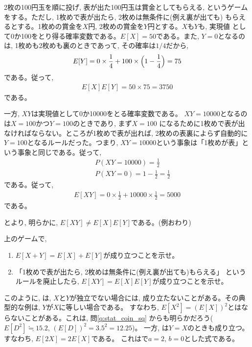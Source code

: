 \begin{exmpl} 2枚の100円玉を順に投げ, 表が出た100円玉は賞金としてもらえる, 
というゲームをする。ただし, 1枚めで表が出たら, 2枚めは無条件に(例え裏が出ても)
もらえるとする。1枚めの賞金を$X$円, 2枚めの賞金を$Y$円とする。$X$も$Y$も, 実現値
として0か100をとり得る確率変数である。$E[X]=50$である。また, 
$Y=0$となるのは, 1枚めも2枚めも裏のときであって, その確率は$1/4$だから, 
\begin{eqnarray}
E[Y]=0\times\frac{1}{4}+100\times\Bigl(1-\frac{1}{4}\Bigr)=75
\end{eqnarray}
である。従って, 
\begin{eqnarray}
E[X]E[Y]=50\times75=3750\label{eq:prob_3750}
\end{eqnarray}である。

一方, $XY$は実現値として0か10000をとる確率変数である。
$XY=10000$となるのは$X=100$かつ$Y=100$のときであり, まず$X=100$
になるために1枚めで表が出なければならない。ところが1枚めで表が出れば, 
2枚めの表裏によらず自動的に$Y=100$となるルールだった。つまり, 
$XY=10000$という事象は「1枚めが表」という事象と同じである。従って, 
\begin{eqnarray}
&&P(XY=10000)=\frac{1}{2}\\
&&P(XY=0)=1-\frac{1}{2}=\frac{1}{2}
\end{eqnarray}
である。従って, 
\begin{eqnarray}
E[XY]=0\times\frac{1}{2}+10000\times\frac{1}{2}=5000\label{eq:prob_5000}
\end{eqnarray}
である。

とより, 明らかに, 
$E[XY]\neq E[X]E[Y]$である。(例おわり)
\end{exmpl}
\mv

\begin{q}\label{q:stat_2coins_indep} 上のゲームで, 
\begin{enumerate}
\item $E[X+Y]=E[X]+E[Y]$が成り立つことを示せ。
\item 「1枚めで表が出たら, 2枚めは無条件に(例え裏が出ても)もらえる」
というルールを廃止したら, $E[XY]=E[X]E[Y]$が成り立つことを示せ。
\end{enumerate}
\end{q}
\mv

このように, は, $X$と$Y$が独立でない場合には, 
成り立たないことがある。その典型的な例は, $Y$が$X$に等しい場合である。
すなわち, $E[X^2]=(E[X])^2$とはならないことがある。これは, 問\ref{q:stat_coin_sq}
からも明らかだろう($E[D^2]\fallingdotseq15.2$, $(E[D])^2=3.5^2=12.25$)。
一方, は$Y=X$のときも成り立つ。すなわち, $E[2X]=2E[X]$である。
これはで$a=2$, $b=0$とした式である。


